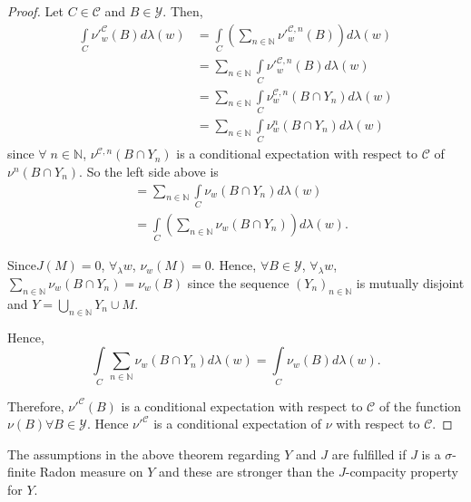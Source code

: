 \begin{proof}
Let $C \in \mathscr{C}$ and $B \in \mathscr{Y}$. Then,
\begin{align*}
\int\limits_C {\nu'}^\mathscr{C}_w(B) d \lambda(w) & = \int\limits_C
(\sum\limits_{n \in\mathbb{N}} {\nu'}^{\mathscr{C}, n}_w (B))
d\lambda(w)\\
& = \sum\limits_{n \in \mathbb{N}} \int\limits_C {\nu'}^{\mathscr{C},
  n}_w (B) d \lambda (w)\\
& = \sum\limits_{n \in\mathbb{N}} \int\limits_C \nu^{\mathscr{C}, n}_w
(B \cap Y_n) d\lambda(w)\\
& = \sum\limits_{n \in \mathbb{N}} \int\limits_C \nu^n_w (B\cap Y_n) d
\lambda(w) 
\end{align*}
since $\forall \; n \in\mathbb{N}$, $\nu^{\mathscr{C},n} (B \cap Y_n)$
is a conditional expectation with respect to $\mathscr{C}$ of $\nu^n(B
\cap Y_n)$. So the left side above is 
\begin{align*}
& = \sum\limits_{n \in\mathbb{N}} \int\limits_C \nu_w (B \cap Y_n) d
  \lambda(w)\\
& = \int\limits_C (\sum\limits_{n \in\mathbb{N}} \nu_w (B \cap Y_n)) d
  \lambda(w). 
\end{align*}

Since\pageoriginale $J(M) = 0$, $\forall_\lambda w$, $\nu_w (M) =
0$. Hence, $\forall B \in \mathscr{Y}$, $\forall_\lambda w$,
$\sum\limits_{n\in \mathbb{N}} \nu_w (B \cap Y_n) = \nu_w (B)$ since
the sequence $(Y_n)_{n \in \mathbb{N}}$ is mutually disjoint and $Y =
\bigcup\limits_{n \in \mathbb{N}} Y_n \cup M$. 

Hence, 
$$
\int\limits_C \sum\limits_{n\in\mathbb{N}} \nu_w (B \cap Y_n) d
\lambda(w) = \int\limits_C \nu_w (B) d \lambda (w). 
$$

Therefore, ${\nu'}^\mathscr{C} (B)$  is a conditional expectation with
respect to $\mathscr{C}$ of the function $\nu(B) \forall B \in
\mathscr{Y}$. Hence ${\nu'}^\mathscr{C}$ is a conditional expectation
of $\nu$ with respect to $\mathscr{C}$.
 \end{proof}


\begin{rem}\label{part1:chap3:rem39}
The assumptions in the above theorem regarding $Y$ and $J$ are
fulfilled if $J$ is a $\sigma$-finite Radon measure on $Y$ and these
are stronger than the $J$-compacity property for $Y$. 
\end{rem}


